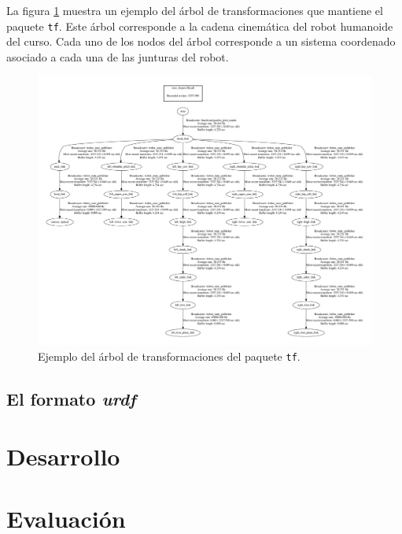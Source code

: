 \documentclass[letterpaper,12pt]{article}
\begin{document}
La figura \ref{fig:frames} muestra un ejemplo del árbol de transformaciones que mantiene el paquete \texttt{tf}. Este árbol corresponde a la cadena cinemática del robot humanoide del curso. Cada uno de los nodos del árbol corresponde a un sistema coordenado asociado a cada una de las junturas del robot. 
\begin{figure}
  \centering
  \includegraphics[width=\textwidth]{frames.pdf}
  \caption{Ejemplo del árbol de transformaciones del paquete \texttt{tf}.}
  \label{fig:frames}
\end{figure}

\subsection{El formato \textit{urdf}}

\section{Desarrollo}

\section{Evaluación}
\end{document}
